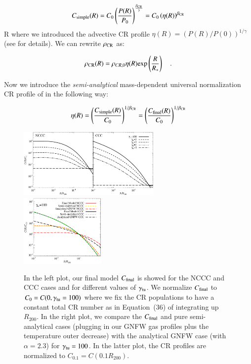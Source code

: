 \documentclass[traditabstract]{aa}
\newcommand{\rmn}{\mathrm}
\begin{document}
\begin{equation}
C_{\rm{simple}}(R)=C_{0} \left( \frac{P(R)}{P_{0}} \right)^{\frac{\beta_{\rm{CR}}}{\gamma}} = C_{0} \left( \eta(R) \right)^{\beta_{\rm{CR}}}
\label{eq:Csimple_1}
\end{equation} 
R
where we introduced the advective CR profile $\eta(R)=(P(R)/P(0))^{1/\gamma}$ (see \citealp{2011A&A...527A..99E} for details). We can rewrite $\rho_{\rm{CR}}$ as:

\begin{equation}
\rho_{\rm{CR}}(R) = \rho_{CR,0} \eta(R) \rmn{exp} \left( \frac{R}{R_{*}} \right) \quad .
\label{eg:rhoCR_1}
\end{equation} 

Now we introduce the \emph{semi-analytical} mass-dependent universal normalization CR profile of \cite{2010MNRAS.409..449P} in the following way:

\begin{equation}
\eta(R) = \left( \frac{C_{\rm{simple}}(R)}{C_0} \right)^{1/\beta_{\rm{CR}}} = \left( \frac{C_{\rm{final}}(R)}{C_0} \right)^{1/\beta_{\rm{CR}}}
\label{eq:eta}
\end{equation} 

\begin{figure}[hbt!]
\centering
\includegraphics[width=0.62\textwidth]{figures/CR_profiles_FinalModel.eps}
\includegraphics[width=0.37\textwidth]{figures/CR_profiles_FinalModelvsREX_norm0.1.eps}
\caption{In the left plot, our final model $C_{\rm{final}}$ is showed for the NCCC and CCC cases and for different values of $\gamma_{\rm{tu}}$. We normalize $C_{\rm{final}}$ to $C_{0}=C(0,\gamma_{\rm{tu}}=100)$ where we fix the CR populations to have a constant total CR number as in Equation~(36) of \cite{2011A&A...527A..99E} integrating up $R_{200}$. In the right plot, we compare the $C_{\rm{final}}$ and pure semi-analytical cases (plugging in our GNFW gas profiles plus the temperature outer decrease) with the analytical GNFW case (with $\alpha=2.3$) for $\gamma_{\rm{tu}}=100$. In the latter plot, the CR profiles are normalized to $C_{0.1}=C(0.1R_{200})$.}
\label{fig:CRFinalModel}
\end{figure}
\end{document}
